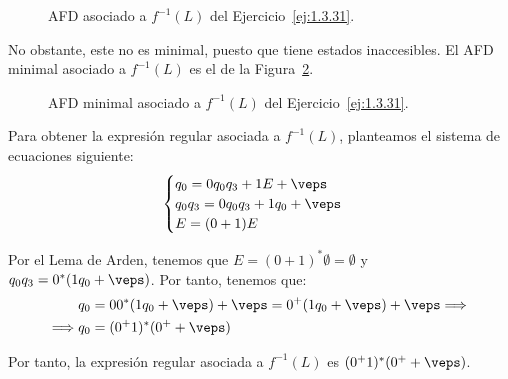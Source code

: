 \begin{ejercicio}
\begin{figure}
        \caption{AFD asociado a $f^{-1}(L)$ del Ejercicio~\ref{ej:1.3.31}.}
        \label{fig:1.3.31-f-1-L}
    \end{figure}

    No obstante, este no es minimal, puesto que tiene estados inaccesibles. El AFD minimal asociado a $f^{-1}(L)$ es el de la Figura~\ref{fig:1.3.31-f-1-L-minimal}.
    \begin{figure}
        \centering
        \caption{AFD minimal asociado a $f^{-1}(L)$ del Ejercicio~\ref{ej:1.3.31}.}
        \label{fig:1.3.31-f-1-L-minimal}
    \end{figure}

    Para obtener la expresión regular asociada a $f^{-1}(L)$, planteamos el sistema de ecuaciones siguiente:
    \begin{equation*}
        \begin{cases}
            q_0 = 0q_0q_3 + 1E+\veps\\
            q_0q_3 = 0q_0q_3 + 1q_0+\veps\\
            E = (0+1)E
        \end{cases}
    \end{equation*}

    Por el Lema de Arden, tenemos que $E=(0+1)^{\ast}\emptyset=\emptyset$ y $q_0q_3=0^*(1q_0+\veps)$. Por tanto, tenemos que:
    \begin{align*}
        q_0 &= 00^*(1q_0+\veps) +\veps
        = 0^+(1q_0+\veps) + \veps
        \Longrightarrow \\
        \Longrightarrow 
        q_0 &= (0^{+}1)^*(0^+ + \veps)
    \end{align*}

    Por tanto, la expresión regular asociada a $f^{-1}(L)$ es $(0^{+}1)^*(0^+ + \veps)$.

\end{ejercicio}

